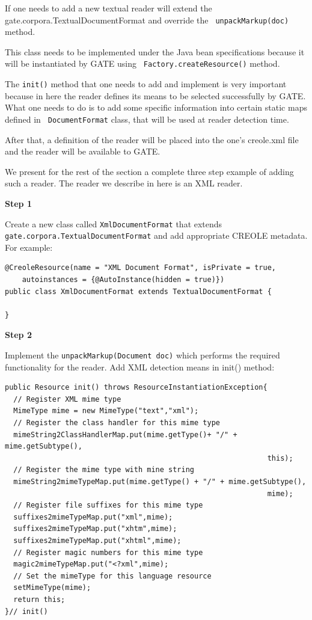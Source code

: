 If one needs to add a new textual reader will extend the
gate.corpora.TextualDocumentFormat and override the {\tt
unpackMarkup(doc)} method.

This class needs to be implemented under the Java bean
specifications because it will be instantiated by GATE using {\tt
Factory.createResource()} method.

The {\tt init()} method that one needs to add and implement is
very important because in here the reader defines its means to be
selected successfully by GATE. What one needs to do is to add some
specific information into certain static maps defined in {\tt
DocumentFormat} class, that will be used at reader detection time.

After that, a definition of the reader will be placed into the
one's creole.xml file and the reader will be available to GATE.

We present for the rest of the section a complete three step
example of adding such a reader. The reader we describe in here is
an XML reader.

{\bf Step 1}

Create a new class called {\tt XmlDocumentFormat} that extends\\
{\tt gate.corpora.TextualDocumentFormat} and add appropriate CREOLE metadata.
For example:

\small
\begin{lstlisting}
@CreoleResource(name = "XML Document Format", isPrivate = true,
    autoinstances = {@AutoInstance(hidden = true)})
public class XmlDocumentFormat extends TextualDocumentFormat {

}
\end{lstlisting}
\nnormalsize

{\bf Step 2}

Implement the {\tt unpackMarkup(Document doc)} which performs the
required functionality for the reader. Add XML detection means in
init() method:

\small
\begin{lstlisting}
public Resource init() throws ResourceInstantiationException{
  // Register XML mime type
  MimeType mime = new MimeType("text","xml");
  // Register the class handler for this mime type
  mimeString2ClassHandlerMap.put(mime.getType()+ "/" + mime.getSubtype(),
                                                             this);
  // Register the mime type with mine string
  mimeString2mimeTypeMap.put(mime.getType() + "/" + mime.getSubtype(),
                                                             mime);
  // Register file suffixes for this mime type
  suffixes2mimeTypeMap.put("xml",mime);
  suffixes2mimeTypeMap.put("xhtm",mime);
  suffixes2mimeTypeMap.put("xhtml",mime);
  // Register magic numbers for this mime type
  magic2mimeTypeMap.put("<?xml",mime);
  // Set the mimeType for this language resource
  setMimeType(mime);
  return this;
}// init()
\end{lstlisting}
\nnormalsize

